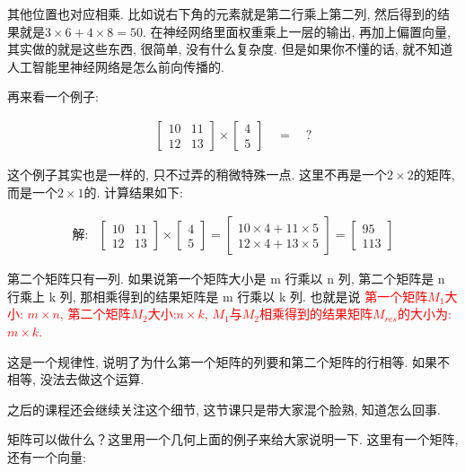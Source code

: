其他位置也对应相乘. 比如说右下角的元素就是第二行乘上第二列, 然后得到的结果就是$3 \times 6 + 4 \times 8 = 50$. 在神经网络里面权重乘上一层的输出, 再加上偏置向量, 其实做的就是这些东西, 很简单, 没有什么复杂度. 但是如果你不懂的话, 就不知道人工智能里神经网络是怎么前向传播的. 

再来看一个例子:

\begin{align*}
	\begin{bmatrix} 10 & 11 \\ 12 & 13 \end{bmatrix}
	\times \begin{bmatrix} 4 \\ 5 \end{bmatrix} \quad = \quad ?
\end{align*}

这个例子其实也是一样的, 只不过弄的稍微特殊一点. 这里不再是一个$2 \times 2$的矩阵, 而是一个$2 \times 1$的. 计算结果如下:

\begin{align*}
    \mbox{解:} 
    & \begin{bmatrix} 10 & 11 \\ 12 & 13 \end{bmatrix}
    \times \begin{bmatrix} 4 \\ 5 \end{bmatrix} 
    = \begin{bmatrix} 10 \times 4 + 11 \times 5 \\ 12 \times 4 + 13 \times 5 \end{bmatrix} 
    =\begin{bmatrix} 95 \\ 113 \end{bmatrix}
\end{align*}

第二个矩阵只有一列. 如果说第一个矩阵大小是 m 行乘以 n 列, 第二个矩阵是 n 行乘上 k 列, 那相乘得到的结果矩阵是 m 行乘以 k 列. 也就是说 \textcolor{red}{第一个矩阵$M_1$大小: $m\times n$, 第二个矩阵$M_2$大小:$n\times k$, $M_1$与$M_2$相乘得到的结果矩阵$M_{res}$的大小为: $m\times k$. }

这是一个规律性, 说明了为什么第一个矩阵的列要和第二个矩阵的行相等. 如果不相等, 没法去做这个运算. 

之后的课程还会继续关注这个细节, 这节课只是带大家混个脸熟, 知道怎么回事. 

矩阵可以做什么？这里用一个几何上面的例子来给大家说明一下. 这里有一个矩阵, 还有一个向量:

